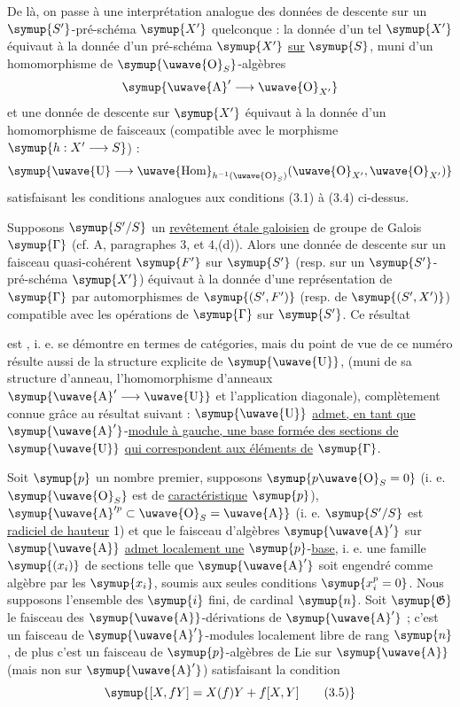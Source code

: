 De là, on passe à une interprétation analogue des données de descente sur un
$\symup{S'}$-pré-schéma $\symup{X'}$ quelconque : la donnée d'un tel $\symup{X'}$ équivaut à la donnée
d'un pré-schéma $\symup{X'}$ \uline{sur} $\symup{S}$, muni d'un homomorphisme de $\symup{\text{\uwave{O}}_S}$-algèbres
\[
  \symup{\text{\uwave{A}}'\longrightarrow\text{\uwave{O}}_{X'}}
\]
et une donnée de descente sur $\symup{X'}$ équivaut à la donnée d'un homomorphisme de
faisceaux (compatible avec le morphisme $\symup{h:X'\longrightarrow S}$) :
\[
  \symup{\text{\uwave{U}}\longrightarrow
  \mathop{\text{\uwave{Hom}}}\nolimits_{h^{-1}(\text{\uwave{O}}_S)}
  (\text{\uwave{O}}_{X'},\text{\uwave{O}}_{X'})}
\]
satisfaisant les conditions analogues aux conditions (3.1) à (3.4) ci-dessus.

 Supposons $\symup{S'/S}$ un \uline{revêtement étale galoisien} de groupe de Galois $\symup{\Gamma}$ (cf. A, paragraphes 3, et 4,(d)). Alors une
donnée de descente sur un faisceau quasi-cohérent $\symup{F'}$ sur $\symup{S'}$ (resp. sur un
$\symup{S'}$-pré-schéma $\symup{X'}$) équivaut à la donnée d'une représentation de $\symup{\Gamma}$ par
automorphismes de $\symup{(S',F')}$ (resp. de $\symup{(S',X')}$) compatible avec les opérations
de $\symup{\Gamma}$ sur $\symup{S'}$. Ce résultat

est , i. e. se démontre en termes de catégories, mais du point de vue
de ce numéro résulte aussi de la structure explicite de $\symup{\text{\uwave{U}}}$, (muni de
sa structure d'anneau, l'homomorphisme d'anneaux
$\symup{\text{\uwave{A}}'\longrightarrow\text{\uwave{U}}}$ et l'application diagonale),
complètement connue grâce au résultat suivant : $\symup{\text{\uwave{U}}}$ \uline{admet, en tant que}
$\symup{\text{\uwave{A}}'}$-\uline{module à gauche, une base formée des sections de} $\symup{\text{\uwave{U}}}$ \uline{qui correspondent aux éléments de} $\symup{\Gamma}$.

 Soit $\symup{p}$ un nombre premier, supposons
$\symup{p\text{\uwave{O}}_S=0}$ (i. e. $\symup{\text{\uwave{O}}_S}$ est de \uline{caractéristique} $\symup{p}$),
$\symup{\text{\uwave{A}}'^p\subset\text{\uwave{O}}_S=\text{\uwave{A}}}$ (i. e. $\symup{S'/S}$ est \uline{radiciel de hauteur} 1) et que le faisceau d'algèbres $\symup{\text{\uwave{A}}'}$ sur $\symup{\text{\uwave{A}}}$ \uline{admet localement une} $\symup{p}$-\uline{base}, i. e. une famille $\symup{(x_i)}$ de sections telle que
$\symup{\text{\uwave{A}}'}$ soit engendré comme algèbre par les $\symup{x_i}$, soumis aux seules
conditions $\symup{x_i^p=0}$. Nous supposons l'ensemble des $\symup{i}$ fini, de cardinal $\symup{n}$.
Soit $\symup{\mathfrak G}$ le faisceau des $\symup{\text{\uwave{A}}}$-dérivations de $\symup{\text{\uwave{A}}'}$ ;
c'est un faisceau de $\symup{\text{\uwave{A}}'}$-modules localement libre de rang $\symup{n}$, de plus
c'est un faisceau de $\symup{p}$-algèbres de Lie sur $\symup{\text{\uwave{A}}}$ (mais non sur
$\symup{\text{\uwave{A}}'}$) satisfaisant la condition
\begin{equation}
  \symup{[X,fY]=X(f)Y+f[X,Y]
  \tag{3.5}}
\end{equation}

